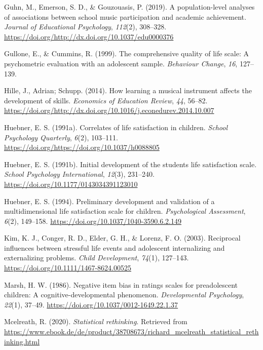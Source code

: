 \documentclass[a4, 12pt]{article}
\begin{document}
\leavevmode\hypertarget{ref-Guhn2019}{}%
Guhn, M., Emerson, S. D., \& Gouzouasis, P. (2019). A population-level analyses of associations between school music participation and academic achievement. \emph{Journal of Educational Psychology}, \emph{112}(2), 308--328. \url{https://doi.org/http://dx.doi.org/10.1037/edu0000376}

\leavevmode\hypertarget{ref-Gullone1999}{}%
Gullone, E., \& Cummins, R. (1999). The comprehensive quality of life scale: A psychometric evaluation with an adolescent sample. \emph{Behaviour Change}, \emph{16}, 127--139.

\leavevmode\hypertarget{ref-Hille2014}{}%
Hille, J., Adrian; Schupp. (2014). How learning a musical instrument affects the development of skills. \emph{Economics of Education Review}, \emph{44}, 56--82. \url{https://doi.org/http://dx.doi.org/10.1016/j.econedurev.2014.10.007}

\leavevmode\hypertarget{ref-Huebner1991}{}%
Huebner, E. S. (1991a). Correlates of life satisfaction in children. \emph{School Psychology Quarterly}, \emph{6}(2), 103--111. \url{https://doi.org/https://doi.org/10.1037/h0088805}

\leavevmode\hypertarget{ref-Huebner1991a}{}%
Huebner, E. S. (1991b). Initial development of the students life satisfaction scale. \emph{School Psychology International}, \emph{12}(3), 231--240. \url{https://doi.org/10.1177/0143034391123010}

\leavevmode\hypertarget{ref-Huebner1994}{}%
Huebner, E. S. (1994). Preliminary development and validation of a multidimensional life satisfaction scale for children. \emph{Psychological Assessment}, \emph{6}(2), 149--158. \url{https://doi.org/10.1037/1040-3590.6.2.149}

\leavevmode\hypertarget{ref-Kim2003}{}%
Kim, K. J., Conger, R. D., Elder, G. H., \& Lorenz, F. O. (2003). Reciprocal influences between stressful life events and adolescent internalizing and externalizing problems. \emph{Child Development}, \emph{74}(1), 127--143. \url{https://doi.org/10.1111/1467-8624.00525}

\leavevmode\hypertarget{ref-Marsh1986}{}%
Marsh, H. W. (1986). Negative item bias in ratings scales for preadolescent children: A cognitive-developmental phenomenon. \emph{Developmental Psychology}, \emph{22}(1), 37--49. \url{https://doi.org/10.1037/0012-1649.22.1.37}

\leavevmode\hypertarget{ref-Mcelreath2020}{}%
Mcelreath, R. (2020). \emph{Statistical rethinking}. Retrieved from \url{https://www.ebook.de/de/product/38708673/richard_mcelreath_statistical_rethinking.html}
\end{document}
